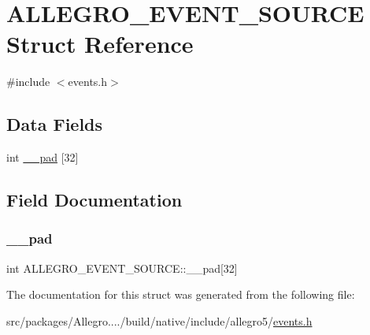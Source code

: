 \hypertarget{struct_a_l_l_e_g_r_o___e_v_e_n_t___s_o_u_r_c_e}{}\section{A\+L\+L\+E\+G\+R\+O\+\_\+\+E\+V\+E\+N\+T\+\_\+\+S\+O\+U\+R\+CE Struct Reference}
\label{struct_a_l_l_e_g_r_o___e_v_e_n_t___s_o_u_r_c_e}


{\ttfamily \#include $<$events.\+h$>$}

\subsection*{Data Fields}
\begin{DoxyCompactItemize}
\item 
int \hyperlink{struct_a_l_l_e_g_r_o___e_v_e_n_t___s_o_u_r_c_e_a887318f518ce493c61a5bb9231f0d635}{\+\_\+\+\_\+pad} \mbox{[}32\mbox{]}
\end{DoxyCompactItemize}


\subsection{Field Documentation}
\mbox{\label{struct_a_l_l_e_g_r_o___e_v_e_n_t___s_o_u_r_c_e_a887318f518ce493c61a5bb9231f0d635}} 
\subsubsection{\texorpdfstring{\+\_\+\+\_\+pad}{\_\_pad}}
{\footnotesize\ttfamily int A\+L\+L\+E\+G\+R\+O\+\_\+\+E\+V\+E\+N\+T\+\_\+\+S\+O\+U\+R\+C\+E\+::\+\_\+\+\_\+pad\mbox{[}32\mbox{]}}



The documentation for this struct was generated from the following file\+:\begin{DoxyCompactItemize}
\item 
src/packages/\+Allegro..../build/native/include/allegro5/\hyperlink{events_8h}{events.\+h}\end{DoxyCompactItemize}
